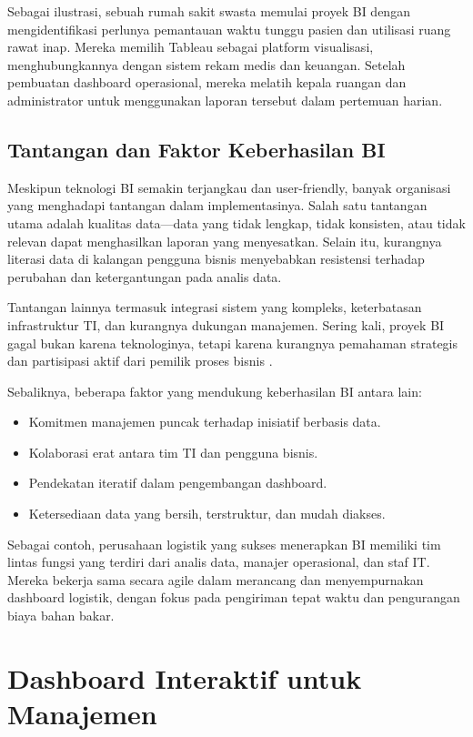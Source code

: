 Sebagai ilustrasi, sebuah rumah sakit swasta memulai proyek BI dengan mengidentifikasi perlunya pemantauan waktu tunggu pasien dan utilisasi ruang rawat inap. Mereka memilih Tableau sebagai platform visualisasi, menghubungkannya dengan sistem rekam medis dan keuangan. Setelah pembuatan dashboard operasional, mereka melatih kepala ruangan dan administrator untuk menggunakan laporan tersebut dalam pertemuan harian.

\subsection{Tantangan dan Faktor Keberhasilan BI}

Meskipun teknologi BI semakin terjangkau dan user-friendly, banyak organisasi yang menghadapi tantangan dalam implementasinya. Salah satu tantangan utama adalah kualitas data—data yang tidak lengkap, tidak konsisten, atau tidak relevan dapat menghasilkan laporan yang menyesatkan. Selain itu, kurangnya literasi data di kalangan pengguna bisnis menyebabkan resistensi terhadap perubahan dan ketergantungan pada analis data.

Tantangan lainnya termasuk integrasi sistem yang kompleks, keterbatasan infrastruktur TI, dan kurangnya dukungan manajemen. Sering kali, proyek BI gagal bukan karena teknologinya, tetapi karena kurangnya pemahaman strategis dan partisipasi aktif dari pemilik proses bisnis \cite{shanks2003successful}.

Sebaliknya, beberapa faktor yang mendukung keberhasilan BI antara lain:
\begin{itemize}
	\item Komitmen manajemen puncak terhadap inisiatif berbasis data.
	\item Kolaborasi erat antara tim TI dan pengguna bisnis.
	\item Pendekatan iteratif dalam pengembangan dashboard.
	\item Ketersediaan data yang bersih, terstruktur, dan mudah diakses.
\end{itemize}

Sebagai contoh, perusahaan logistik yang sukses menerapkan BI memiliki tim lintas fungsi yang terdiri dari analis data, manajer operasional, dan staf IT. Mereka bekerja sama secara agile dalam merancang dan menyempurnakan dashboard logistik, dengan fokus pada pengiriman tepat waktu dan pengurangan biaya bahan bakar.




\section{Dashboard Interaktif untuk Manajemen}
